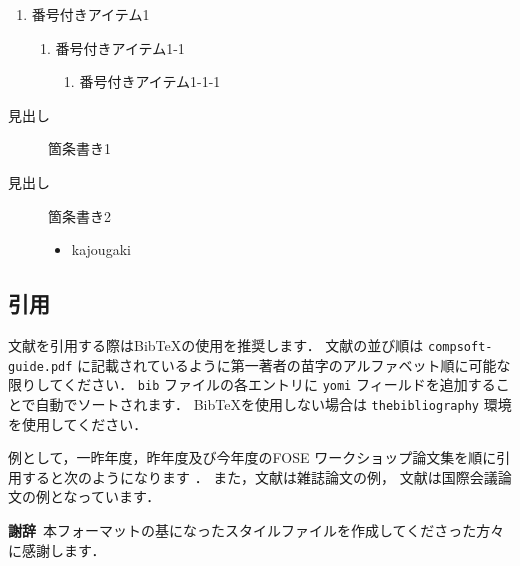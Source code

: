 \documentclass[T,J]{fose} %
\begin{document}
\begin{enumerate}
	\item 番号付きアイテム1
	\begin{enumerate}
		\item 番号付きアイテム1-1
		\begin{enumerate}
			\item 番号付きアイテム1-1-1
		\end{enumerate}
	\end{enumerate}
\end{enumerate}

\begin{description}
	\item[見出し] 箇条書き1
	\item[見出し] 箇条書き2
		\begin{itemize}
			\item kajougaki
		\end{itemize}
\end{description}


\subsection{引用}

文献を引用する際はBibTeXの使用を推奨します．
文献の並び順は \texttt{compsoft-guide.pdf} に記載されているように第一著者の苗字のアルファベット順に可能な限りしてください．
\texttt{bib} ファイルの各エントリに \texttt{yomi} フィールドを追加することで自動でソートされます．
BibTeXを使用しない場合は \texttt{thebibliography} 環境を使用してください．

例として，一昨年度，昨年度及び今年度のFOSE ワークショップ論文集を順に引用すると次のようになります
\cite{fose2023}\cite{fose2024}\cite{fose2025}．
また，文献\cite{sample_journal}は雑誌論文の例，
文献\cite{sample_conference}は国際会議論文の例となっています．


\textbf{謝辞}\
本フォーマットの基になったスタイルファイルを作成してくださった方々に感謝します．



\end{document}
